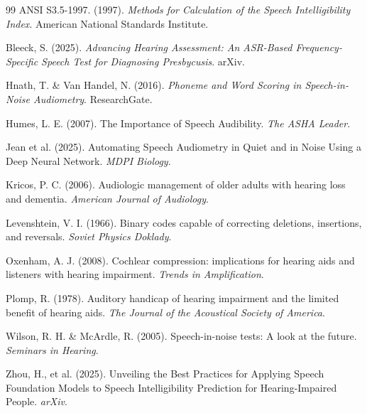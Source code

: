 \documentclass{article}
\begin{document}
\begin{thebibliography}{99}
 ANSI S3.5-1997. (1997). \textit{Methods for Calculation of the Speech Intelligibility Index}. American National Standards Institute.

 Bleeck, S. (2025). \textit{Advancing Hearing Assessment: An ASR-Based Frequency-Specific Speech Test for Diagnosing Presbycusis}. arXiv.

 Hnath, T. \& Van Handel, N. (2016). \textit{Phoneme and Word Scoring in Speech-in-Noise Audiometry}. ResearchGate.

 Humes, L. E. (2007). The Importance of Speech Audibility. \textit{The ASHA Leader}.

 Jean et al. (2025). Automating Speech Audiometry in Quiet and in Noise Using a Deep Neural Network. \textit{MDPI Biology}.

 Kricos, P. C. (2006). Audiologic management of older adults with hearing loss and dementia. \textit{American Journal of Audiology}.

 Levenshtein, V. I. (1966). Binary codes capable of correcting deletions, insertions, and reversals. \textit{Soviet Physics Doklady}.

 Oxenham, A. J. (2008). Cochlear compression: implications for hearing aids and listeners with hearing impairment. \textit{Trends in Amplification}.

 Plomp, R. (1978). Auditory handicap of hearing impairment and the limited benefit of hearing aids. \textit{The Journal of the Acoustical Society of America}.

 Wilson, R. H. \& McArdle, R. (2005). Speech-in-noise tests: A look at the future. \textit{Seminars in Hearing}.

 Zhou, H., et al. (2025). Unveiling the Best Practices for Applying Speech Foundation Models to Speech Intelligibility Prediction for Hearing-Impaired People. \textit{arXiv}.

\end{thebibliography}
\end{document}
